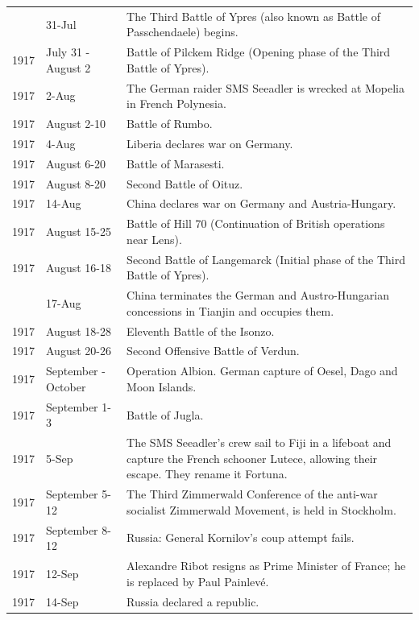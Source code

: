 \documentclass[
  openany]{book}
\begin{document}
\begin{longtable}[t]{rl>{\raggedright\arraybackslash}p{22em}}
\addlinespace
1917 & 31-Jul & The Third Battle of Ypres (also known as Battle of Passchendaele) begins.\\
\rowcolor{gray!6}  1917 & July 31 - August 2 & Battle of Pilckem Ridge (Opening phase of the Third Battle of Ypres).\\
1917 & 2-Aug & The German raider SMS Seeadler is wrecked at Mopelia in French Polynesia.\\
\rowcolor{gray!6}  1917 & August 2-10 & Battle of Rumbo.\\
1917 & 4-Aug & Liberia declares war on Germany.\\
\addlinespace
\rowcolor{gray!6}  1917 & August 6-20 & Battle of Marasesti.\\
1917 & August 8-20 & Second Battle of Oituz.\\
\rowcolor{gray!6}  1917 & 14-Aug & China declares war on Germany and Austria-Hungary.\\
1917 & August 15-25 & Battle of Hill 70 (Continuation of British operations near Lens).\\
\rowcolor{gray!6}  1917 & August 16-18 & Second Battle of Langemarck (Initial phase of the Third Battle of Ypres).\\
\addlinespace
1917 & 17-Aug & China terminates the German and Austro-Hungarian concessions in Tianjin and occupies them.\\
\rowcolor{gray!6}  1917 & August 18-28 & Eleventh Battle of the Isonzo.\\
1917 & August 20-26 & Second Offensive Battle of Verdun.\\
\rowcolor{gray!6}  1917 & September - October & Operation Albion. German capture of Oesel, Dago and Moon Islands.\\
1917 & September 1-3 & Battle of Jugla.\\
\addlinespace
\rowcolor{gray!6}  1917 & 5-Sep & The SMS Seeadler's crew sail to Fiji in a lifeboat and capture the French schooner Lutece, allowing their escape. They rename it Fortuna.\\
1917 & September 5-12 & The Third Zimmerwald Conference of the anti-war socialist Zimmerwald Movement, is held in Stockholm.\\
\rowcolor{gray!6}  1917 & September 8-12 & Russia: General Kornilov's coup attempt fails.\\
1917 & 12-Sep & Alexandre Ribot resigns as Prime Minister of France; he is replaced by Paul Painlevé.\\
\rowcolor{gray!6}  1917 & 14-Sep & Russia declared a republic.\\

\end{longtable}
\end{document}
